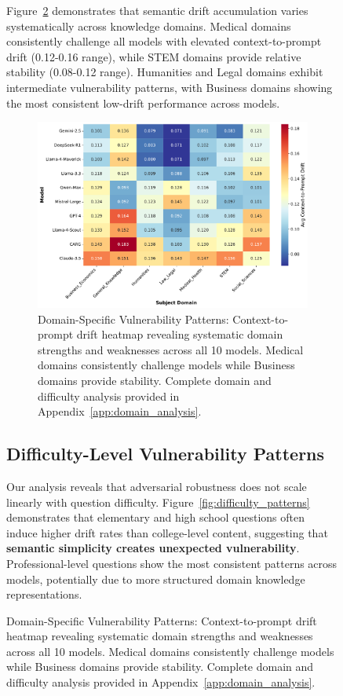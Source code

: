 \documentclass[letterpaper]{article}
\begin{document}
\begin{figure}[ht]
Figure~\ref{fig:domain_analysis} demonstrates that semantic drift accumulation varies systematically across knowledge domains. Medical domains consistently challenge all models with elevated context-to-prompt drift (0.12-0.16 range), while STEM domains provide relative stability (0.08-0.12 range). Humanities and Legal domains exhibit intermediate vulnerability patterns, with Business domains showing the most consistent low-drift performance across models.

\begin{figure}[ht]
\centering
\includegraphics[width=\columnwidth]{figs/model_subject_clustering_heatmap.pdf}
\caption{Domain-Specific Vulnerability Patterns: Context-to-prompt drift heatmap revealing systematic domain strengths and weaknesses across all 10 models. Medical domains consistently challenge models while Business domains provide stability. Complete domain and difficulty analysis provided in Appendix~\ref{app:domain_analysis}.}
\label{fig:domain_analysis}
\end{figure}

\subsection{Difficulty-Level Vulnerability Patterns}

Our analysis reveals that adversarial robustness does not scale linearly with question difficulty. Figure~\ref{fig:difficulty_patterns} demonstrates that elementary and high school questions often induce higher drift rates than college-level content, suggesting that \textbf{semantic simplicity creates unexpected vulnerability}. Professional-level questions show the most consistent patterns across models, potentially due to more structured domain knowledge representations.


\end{figure}
\end{document}
